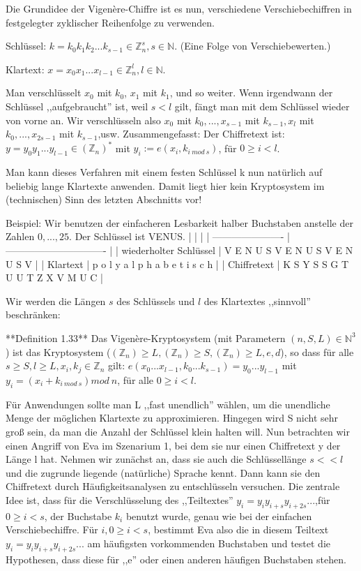 \documentclass[a4paper]{article}
\begin{document}
\begin{multicols}{3}
        Die Grundidee der Vigenère-Chiffre ist es nun, verschiedene Verschiebechiffren in festgelegter zyklischer Reihenfolge zu verwenden.

        Schlüssel: $k=k_0 k_1 k_2 ...k_{s-1}\in\mathbb{Z}^s_n,s\in\mathbb{N}$. (Eine Folge von Verschiebewerten.)

        Klartext: $x=x_0 x_1...x_{l-1} \in\mathbb{Z}^l_n,l\in\mathbb{N}$.

        Man verschlüsselt $x_0$ mit $k_0$, $x_1$ mit $k_1$, und so weiter. Wenn irgendwann der Schlüssel ,,aufgebraucht'' ist, weil $s<l$ gilt, fängt man mit dem Schlüssel wieder von vorne an. Wir verschlüsseln also $x_0$ mit $k_0,...,x_{s-1}$ mit $k_{s-1},x_l$ mit $k_0,...,x_{2s-1}$ mit $k_{s-1}$,usw.
        Zusammengefasst: Der Chiffretext ist: $y=y_0 y_1...y_{l-1}\in(\mathbb{Z}_n)^*$ mit $y_i:=e(x_i,k_{i\ mod\ s})$, für $0\geq i < l$.

        Man kann dieses Verfahren mit einem festen Schlüssel k nun natürlich auf beliebig lange Klartexte anwenden. Damit liegt hier kein Kryptosystem im (technischen) Sinn des letzten Abschnitts vor!

        Beispiel: Wir benutzen der einfacheren Lesbarkeit halber Buchstaben anstelle der Zahlen $0,...,25$. Der Schlüssel ist VENUS.
        |                        |                                 |
        | ---------------------- | ------------------------------- |
        | wiederholter Schlüssel | V E N U S V E N U S V E N U S V |
        | Klartext               | p o l y a l p h a b e t i s c h |
        | Chiffretext            | K S Y S S G T U U T Z X V M U C |

        Wir werden die Längen $s$ des Schlüssels und $l$ des Klartextes ,,sinnvoll'' beschränken:

        **Definition 1.33** Das Vigenère-Kryptosystem (mit Parametern $(n,S,L)\in\mathbb{N}^3$) ist das Kryptosystem ($(\mathbb{Z}_n)\geq L,(\mathbb{Z}_n)\geq S,(\mathbb{Z}_n)\geq L,e,d$), so dass für alle $s\geq S,l\geq L,x_i,k_j\in\mathbb{Z}_n$ gilt: $e(x_0...x_{l-1},k_0 ...k_{s-1})=y_0 ...y_{l-1}$ mit $y_i=(x_i+k_{i\ mod\ s}) mod\ n$, für alle $0\geq i < l$.

        Für Anwendungen sollte man L ,,fast unendlich'' wählen, um die unendliche Menge der möglichen Klartexte zu approximieren. Hingegen wird S nicht sehr groß sein, da man die Anzahl der Schlüssel klein halten will.
        Nun betrachten wir einen Angriff von Eva im Szenarium 1, bei dem sie nur einen Chiffretext y der Länge l hat. Nehmen wir zunächst an, dass sie auch die Schlüssellänge $s<<l$ und die zugrunde liegende (natürliche) Sprache kennt. Dann kann sie den Chiffretext durch Häufigkeitsanalysen zu entschlüsseln versuchen. Die zentrale Idee ist, dass für die Verschlüsselung des ,,Teiltextes'' $y_i=y_iy_{i+s}y_{i+2s}...$,für $0\geq i<s$, der Buchstabe $k_i$ benutzt wurde, genau wie bei der einfachen Verschiebechiffre. Für $i,0\geq i<s$, bestimmt Eva also die in diesem Teiltext $y_i=y_iy_{i+s}y_{i+2s}...$ am häufigsten vorkommenden Buchstaben und testet die Hypothesen, dass diese für ,,e'' oder einen anderen häufigen Buchstaben stehen.


\end{multicols}
\end{document}
